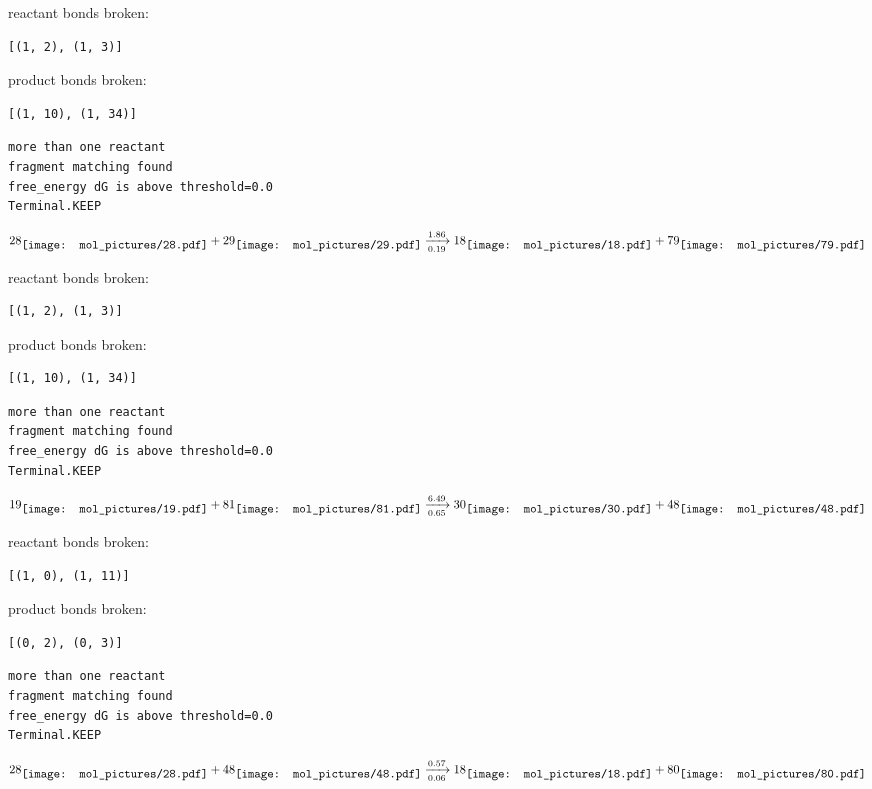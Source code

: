 \documentclass{article}
\begin{document}
reactant bonds broken:\begin{verbatim}
[(1, 2), (1, 3)]
\end{verbatim}
product bonds broken:\begin{verbatim}
[(1, 10), (1, 34)]
\end{verbatim}




\vspace{1cm}
\begin{verbatim}
more than one reactant
fragment matching found
free_energy dG is above threshold=0.0
Terminal.KEEP
\end{verbatim}
$$
28
\raisebox{-.5\height}{\texttt{[image: mol\_pictures/28.pdf]}}
+
29
\raisebox{-.5\height}{\texttt{[image: mol\_pictures/29.pdf]}}
\xrightarrow[0.19]{1.86}
18
\raisebox{-.5\height}{\texttt{[image: mol\_pictures/18.pdf]}}
+
79
\raisebox{-.5\height}{\texttt{[image: mol\_pictures/79.pdf]}}
$$


reactant bonds broken:\begin{verbatim}
[(1, 2), (1, 3)]
\end{verbatim}
product bonds broken:\begin{verbatim}
[(1, 10), (1, 34)]
\end{verbatim}




\vspace{1cm}
\begin{verbatim}
more than one reactant
fragment matching found
free_energy dG is above threshold=0.0
Terminal.KEEP
\end{verbatim}
$$
19
\raisebox{-.5\height}{\texttt{[image: mol\_pictures/19.pdf]}}
+
81
\raisebox{-.5\height}{\texttt{[image: mol\_pictures/81.pdf]}}
\xrightarrow[0.65]{6.49}
30
\raisebox{-.5\height}{\texttt{[image: mol\_pictures/30.pdf]}}
+
48
\raisebox{-.5\height}{\texttt{[image: mol\_pictures/48.pdf]}}
$$


reactant bonds broken:\begin{verbatim}
[(1, 0), (1, 11)]
\end{verbatim}
product bonds broken:\begin{verbatim}
[(0, 2), (0, 3)]
\end{verbatim}




\vspace{1cm}
\begin{verbatim}
more than one reactant
fragment matching found
free_energy dG is above threshold=0.0
Terminal.KEEP
\end{verbatim}
$$
28
\raisebox{-.5\height}{\texttt{[image: mol\_pictures/28.pdf]}}
+
48
\raisebox{-.5\height}{\texttt{[image: mol\_pictures/48.pdf]}}
\xrightarrow[0.06]{0.57}
18
\raisebox{-.5\height}{\texttt{[image: mol\_pictures/18.pdf]}}
+
80
\raisebox{-.5\height}{\texttt{[image: mol\_pictures/80.pdf]}}
$$
\end{document}
